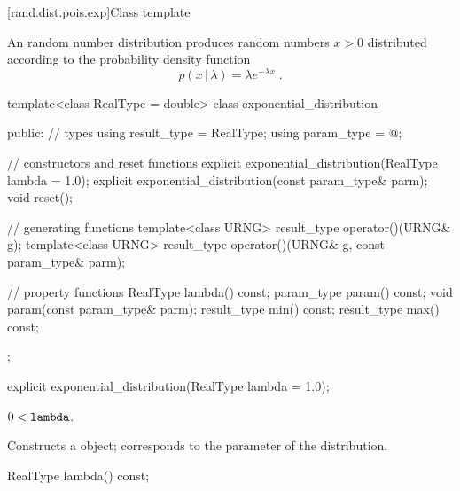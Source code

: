 
[rand.dist.pois.exp]{Class template }%
%

\pnum
An  random number distribution
produces random numbers $x > 0$
distributed according to
the probability density function%
%
\[%
 p(x\,|\,\lambda)
      = \lambda e^{-\lambda x}
\; \mbox{.}
\]

\begin{codeblock}
template<class RealType = double>
 class exponential_distribution
{
public:
 // types
 using result_type = RealType;
 using param_type  = @\unspec@;

 // constructors and reset functions
 explicit exponential_distribution(RealType lambda = 1.0);
 explicit exponential_distribution(const param_type& parm);
 void reset();

 // generating functions
 template<class URNG>
   result_type operator()(URNG& g);
 template<class URNG>
   result_type operator()(URNG& g, const param_type& parm);

 // property functions
 RealType lambda() const;
 param_type param() const;
 void param(const param_type& parm);
 result_type min() const;
 result_type max() const;
};
\end{codeblock}


%
\begin{itemdecl}
explicit exponential_distribution(RealType lambda = 1.0);
\end{itemdecl}

\begin{itemdescr}
\pnum\requires
 $ 0 < \texttt{lambda} $.

\pnum\effects Constructs a  object;
 corresponds to the parameter of the distribution.
\end{itemdescr}

%
%
\begin{itemdecl}
RealType lambda() const;
\end{itemdecl}

